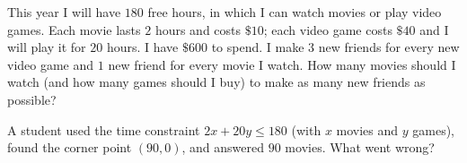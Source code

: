 This year I will have $180$ free hours, in which I can watch movies or play video games. Each movie lasts $2$ hours and costs $\$10$; each video game costs $\$40$ and I will play it for $20$ hours. I have $\$600$ to spend. I make $3$ new friends for every new video game and $1$ new friend for every movie I watch. How many movies should I watch (and how many games should I buy) to make as many new friends as possible?

A student used the time constraint $2x+20y\le180$ (with $x$ movies and $y$ games), found the corner point $(90,0)$, and answered $90$ movies. What went wrong?
